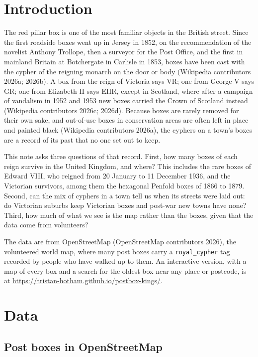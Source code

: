 \documentclass[11pt,a4paper]{article}
\begin{document}
\section{Introduction}

The red pillar box is one of the most familiar objects in the British street. Since the first roadside boxes went up in Jersey in 1852, on the recommendation of the novelist Anthony Trollope, then a surveyor for the Post Office, and the first in mainland Britain at Botchergate in Carlisle in 1853, boxes have been cast with the cypher of the reigning monarch on the door or body (Wikipedia contributors 2026a; 2026b). A box from the reign of Victoria says VR; one from George V says GR; one from Elizabeth II says EIIR, except in Scotland, where after a campaign of vandalism in 1952 and 1953 new boxes carried the Crown of Scotland instead (Wikipedia contributors 2026c; 2026d). Because boxes are rarely removed for their own sake, and out-of-use boxes in conservation areas are often left in place and painted black (Wikipedia contributors 2026a), the cyphers on a town's boxes are a record of its past that no one set out to keep.

This note asks three questions of that record. First, how many boxes of each reign survive in the United Kingdom, and where? This includes the rare boxes of Edward VIII, who reigned from 20 January to 11 December 1936, and the Victorian survivors, among them the hexagonal Penfold boxes of 1866 to 1879. Second, can the mix of cyphers in a town tell us when its streets were laid out: do Victorian suburbs keep Victorian boxes and post-war new towns have none? Third, how much of what we see is the map rather than the boxes, given that the data come from volunteers?

The data are from OpenStreetMap (OpenStreetMap contributors 2026), the volunteered world map, where many post boxes carry a \texttt{royal\_cypher} tag recorded by people who have walked up to them. An interactive version, with a map of every box and a search for the oldest box near any place or postcode, is at \url{https://tristan-hotham.github.io/postbox-kings/}.

\section{Data}

\subsection{Post boxes in OpenStreetMap}
\end{document}
